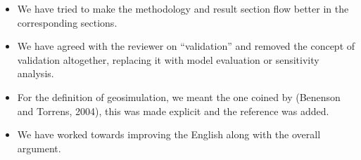 \documentclass[11pt,a4paper,sans]{moderncv}        %
\begin{document}
\begin{itemize}
	\item We have tried to make the methodology and result section flow better in the corresponding sections.
	
	\item We have agreed with the reviewer on ``validation'' and removed the concept of validation altogether, replacing it with model evaluation or sensitivity analysis.
	
	\item For the definition of geosimulation, we meant the one coined by (Benenson and Torrens, 2004), this was made explicit and the reference was added. 
    	
	\item We have worked towards improving the English along with the overall argument. 
	

\end{itemize}
\end{document}
